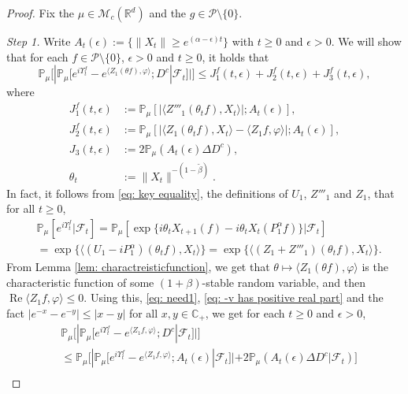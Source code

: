 \documentclass[12pt,a4paper]{amsart}
\theoremstyle{plain}
\theoremstyle{definition}
\numberwithin{equation}{section}
\begin{document}
\begin{proof}
  Fix the $\mu \in \mathcal M_c(\mathbb R^d)$ and the $g \in \mathcal P\setminus \{0\}$.

  \emph{Step 1.} Write $ A_t(\epsilon) :=\{ \|X_t\| \geq e^{(\alpha - \epsilon)t} \} $ with $t\geq 0$ and $\epsilon > 0$.
  We will show that for each $f\in \mathcal P \setminus \{0\}$, $\epsilon > 0$ and $t\geq 0$, it holds that
  \[
    \mathbb P_\mu \Big[ | \mathbb P_\mu [e^{i\Upsilon^f_t} - e^{\langle Z_1(\theta f), \varphi\rangle}; D^c | \mathscr F_t ]| \Big]
    \leq J^f_1(t,\epsilon)+J^f_2(t,\epsilon)+J^f_3(t,\epsilon),
  \]
where
\begin{align}
\label{eq: Def of Ji}
  J^f_1(t,\epsilon)
  & := \mathbb{P}_{\mu} [ |\langle Z'''_1(\theta_t f), X_t\rangle |; A_t(\epsilon) ],
  \\ J^f_2(t,\epsilon)
  & := \mathbb{P}_{\mu}[|\langle Z_1(\theta_t f),X_t \rangle-\langle Z_1f, \varphi\rangle |; A_t(\epsilon)],
  \\ J_3(t,\epsilon)
  & :=2\mathbb{P}_{\mu}(A_t (\epsilon)\Delta D^c),
  \\ \theta_t
  & := \|X_t\|^{-(1 - \tilde \beta)}.
\end{align}
In fact, it follows from \eqref{eq: key equality}, the definitions of $U_1$, $Z'''_1$ and $Z_1$, that for all $t\geq 0$,
\begin{align}
  \label{eq: need1}
  & \mathbb{P}_{\mu}[e^{i\Upsilon^f_t}|\mathscr{F}_t]
    = \mathbb{P}_{\mu}[\exp\{i\theta_t X_{t+1} (f) - i \theta_t X_t(P_1^\alpha f)\} |\mathscr{F}_{t}] \\
  & = \exp\{\langle (U_1 - iP^\alpha_1 ) (\theta_t f),X_t\rangle\}
    = \exp\{\langle (Z_1 + Z'''_1) (\theta_t f),X_t\rangle\}.
\end{align}
From Lemma \ref{lem: charactreisticfunction}, we  get that $\theta\mapsto \langle Z_1(\theta f),\varphi\rangle$ is the characteristic function of some $(1+\beta)$-stable random variable, and then  $\operatorname{Re} \langle Z_1f, \varphi\rangle \leq 0$.
Using this, \eqref{eq: need1}, \eqref{eq: -v has positive real part} and the fact $|e^{-x} - e^{-y}| \leq |x-y|$ for all $x,y \in \mathbb C_+$, we get for each $t\geq 0$ and $\epsilon> 0$,
\begin{align}
  \label{eq: inequality that will used later}
  & \mathbb{P}_\mu \Big[ |  \mathbb{P}_\mu [ e^{i\Upsilon^f_t} - e^{\langle Z_1f,\varphi \rangle} ; D^c | \mathscr F_{t}]   |\Big]  \\
  &  \leq \mathbb{P}_\mu   \Big[ |    \mathbb{P}_\mu [ e^{i \Upsilon^f_t }-e^{\langle Z_1f, \varphi\rangle}; A_{t}(\epsilon) | \mathscr F_{t}] |  + 2\mathbb P_\mu ( A_{t}(\epsilon) \Delta D^c | \mathscr F_{t}) \Big] \\

\end{align}
\end{proof}
\end{document}
